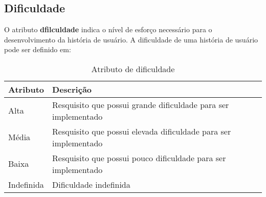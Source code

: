 	\subsection{Dificuldade}
	O atributo \textbf{dfilculdade} indica o nível de esforço necessário para o desenvolvimento da história de usuário. A dificuldade de uma história de usuário pode ser definido em:

	\begin{table}[htbp]
		\centering
		\caption{Atributo de dificuldade}
		\begin{tabular}{|l|l|}
			\hline
			\textbf{Atributo} & \textbf{Descrição} \\ \hline
			Alta & Resquisito que possui grande dificuldade para ser implementado \\ \hline
			Média & Resquisito que possui elevada dificuldade para ser implementado \\ \hline
			Baixa & Resquisito que possui pouco dificuldade para ser implementado \\ \hline
			Indefinida & Dificuldade indefinida \\ \hline
		\end{tabular}
	\label{Atributo de dificuldade}
	\end{table}

	